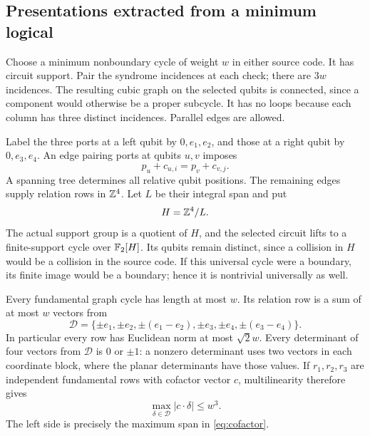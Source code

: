 \subsection{Presentations extracted from a minimum logical}
Choose a minimum nonboundary cycle of weight $w$ in either source code. It has circuit support. Pair the syndrome incidences at each check; there are $3w$ incidences. The resulting cubic graph on the selected qubits is connected, since a component would otherwise be a proper subcycle. It has no loops because each column has three distinct incidences. Parallel edges are allowed.

Label the three ports at a left qubit by $0,e_1,e_2$, and those at a right qubit by $0,e_3,e_4$. An edge pairing ports at qubits $u,v$ imposes
\[
 p_u+c_{u,i}=p_v+c_{v,j}.
\]
A spanning tree determines all relative qubit positions. The remaining edges supply relation rows in $\mathbb Z^4$. Let $L$ be their integral span and put
\begin{equation}\label{eq:presentation}
 H=\mathbb Z^4/L.
\end{equation}
The actual support group is a quotient of $H$, and the selected circuit lifts to a finite-support cycle over $\mathbb F_2[H]$. Its qubits remain distinct, since a collision in $H$ would be a collision in the source code. If this universal cycle were a boundary, its finite image would be a boundary; hence it is nontrivial universally as well.

Every fundamental graph cycle has length at most $w$. Its relation row is a sum of at most $w$ vectors from
\begin{equation}\label{eq:roots}
 \mathcal D=\{\pm e_1,\pm e_2,\pm(e_1-e_2),
                   \pm e_3,\pm e_4,\pm(e_3-e_4)\}.
\end{equation}
In particular every row has Euclidean norm at most $\sqrt2w$. Every determinant of four vectors from $\mathcal D$ is $0$ or $\pm1$: a nonzero determinant uses two vectors in each coordinate block, where the planar determinants have those values. If $r_1,r_2,r_3$ are independent fundamental rows with cofactor vector $c$, multilinearity therefore gives
\begin{equation}\label{eq:row-bound}
 \max_{\delta\in\mathcal D}|c\cdot\delta|\le w^3.
\end{equation}
The left side is precisely the maximum span in \eqref{eq:cofactor}.

